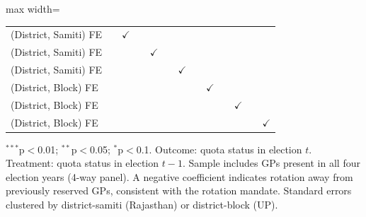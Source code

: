 \begin{adjustbox}{max width=\linewidth}
\begin{threeparttable}[b]
\begin{tabular}{lcccccccccccc}
          \\
         (District, Samiti) FE &              & $\checkmark$  &               &               &               &               &               &               &               &               &               & \\  
         (District, Samiti) FE &              &               &               & $\checkmark$  &               &               &               &               &               &               &               & \\  
         (District, Samiti) FE &              &               &               &               &               & $\checkmark$  &               &               &               &               &               & \\  
         (District, Block) FE  &              &               &               &               &               &               &               & $\checkmark$  &               &               &               & \\  
         (District, Block) FE  &              &               &               &               &               &               &               &               &               & $\checkmark$  &               & \\  
         (District, Block) FE  &              &               &               &               &               &               &               &               &               &               &               & $\checkmark$\\   
         \bottomrule
      \end{tabular}
      
      \begin{tablenotes}
         \item $^{***}$p$<$0.01; $^{**}$p$<$0.05; $^{*}$p$<$0.1. Outcome: quota status in election $t$. Treatment: quota status in election $t-1$. Sample includes GPs present in all four election years (4-way panel). A negative coefficient indicates rotation away from previously reserved GPs, consistent with the rotation mandate. Standard errors clustered by district-samiti (Rajasthan) or district-block (UP).
      \end{tablenotes}
   \end{threeparttable}
\end{adjustbox}
\par\endgroup


